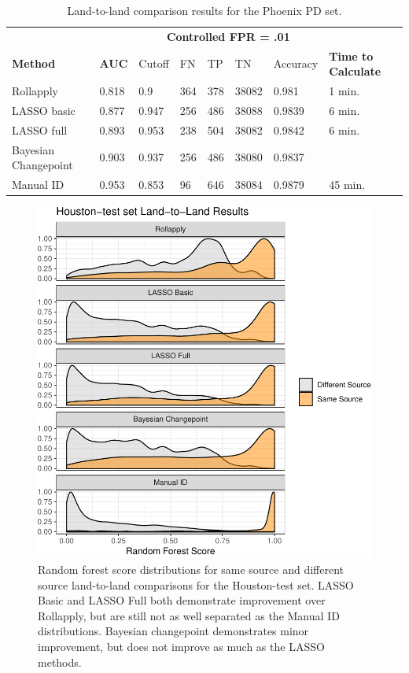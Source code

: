 \documentclass[12pt]{article}
\begin{document}
\begin{table}[]
\centering
\begin{tabular}{llllllll}
& & \multicolumn{5}{c}{\textbf{Controlled FPR = .01}} & \\
\textbf{Method} & \textbf{AUC} & Cutoff & FN &TP & TN & Accuracy & \textbf{Time to Calculate} \\ \hline
Rollapply & 0.818 &  0.9 & 364 & 378&38082 & 0.981& 1 min. \\ \hline
LASSO basic & 0.877 &  0.947 &256 & 486&38088 & 0.9839 & 6 min. \\ \hline
LASSO full & 0.893 &  0.953 &238 &504 &38082 & 0.9842  & 6 min. \\ \hline
Bayesian Changepoint & 0.903 &  0.937 &256 & 486&38080 & 0.9837 &  \\ \hline
Manual ID & 0.953 &  0.853 & 96& 646&38084 & 0.9879 & 45 min. \\ \hline 
\end{tabular}
\caption{Land-to-land comparison results for the Phoenix PD set.}
\label{phoenix-table}
\end{table}

\begin{figure}
\centering
\includegraphics{writeup_files/figure-latex/houston-groove-results-1.pdf}
\caption{\label{houston-groove-results}Random forest score distributions
for same source and different source land-to-land comparisons for the
Houston-test set. LASSO Basic and LASSO Full both demonstrate
improvement over Rollapply, but are still not as well separated as the
Manual ID distributions. Bayesian changepoint demonstrates minor
improvement, but does not improve as much as the LASSO methods.}
\end{figure}
\end{document}
